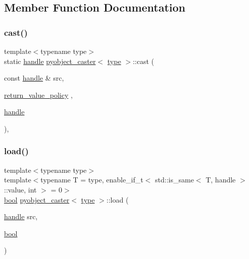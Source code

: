 \subsection{Member Function Documentation}
\mbox{\label{structpyobject__caster_abbc19d02ced2a17c0ddaa8e9b695be31}} 
\subsubsection{\texorpdfstring{cast()}{cast()}}
{\footnotesize\ttfamily template$<$typename type$>$ \\
static \mbox{\hyperlink{classhandle}{handle}} \mbox{\hyperlink{structpyobject__caster}{pyobject\+\_\+caster}}$<$ \mbox{\hyperlink{_s_d_l__opengl_8h_ad5ddf6fca7b585646515660e810e0188}{type}} $>$\+::cast (\begin{DoxyParamCaption}\item[{const \mbox{\hyperlink{classhandle}{handle}} \&}]{src,  }\item[{\mbox{\hyperlink{detail_2common_8h_adde72ab1fb0dd4b48a5232c349a53841}{return\+\_\+value\+\_\+policy}}}]{,  }\item[{\mbox{\hyperlink{classhandle}{handle}}}]{ }\end{DoxyParamCaption})\hspace{0.3cm}{\ttfamily [inline]}, {\ttfamily [static]}}

\mbox{\label{structpyobject__caster_a68cb5b39f3864f5a6c13bc0b99ad3a3b}} 
\subsubsection{\texorpdfstring{load()}{load()}\hspace{0.1cm}{\footnotesize\ttfamily [1/2]}}
{\footnotesize\ttfamily template$<$typename type$>$ \\
template$<$typename T  = type, enable\+\_\+if\+\_\+t$<$ std\+::is\+\_\+same$<$ T, handle $>$\+::value, int $>$  = 0$>$ \\
\mbox{\hyperlink{asdl_8h_af6a258d8f3ee5206d682d799316314b1}{bool}} \mbox{\hyperlink{structpyobject__caster}{pyobject\+\_\+caster}}$<$ \mbox{\hyperlink{_s_d_l__opengl_8h_ad5ddf6fca7b585646515660e810e0188}{type}} $>$\+::load (\begin{DoxyParamCaption}\item[{\mbox{\hyperlink{classhandle}{handle}}}]{src,  }\item[{\mbox{\hyperlink{asdl_8h_af6a258d8f3ee5206d682d799316314b1}{bool}}}]{ }\end{DoxyParamCaption})\hspace{0.3cm}{\ttfamily [inline]}}

